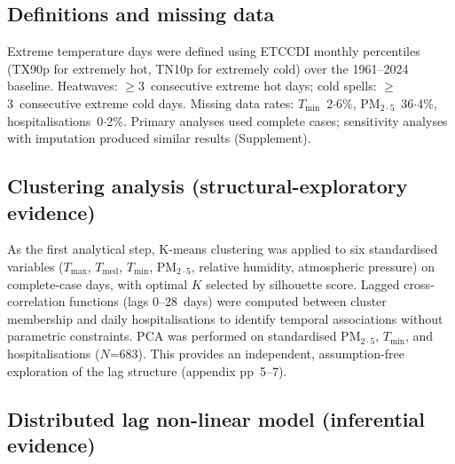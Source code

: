 \documentclass[review,number]{elsarticle}
\begin{document}
\subsection{Definitions and missing data}

Extreme temperature days were defined using ETCCDI monthly percentiles
(TX90p for extremely hot, TN10p for extremely cold) over the 1961--2024
baseline. Heatwaves: $\geq$3~consecutive extreme hot days; cold spells:
$\geq$3~consecutive extreme cold days. Missing data rates:
$T_\mathrm{min}$~2${\cdot}$6\%, $\text{PM}_{2{\cdot}5}$~36${\cdot}$4\%,
hospitalisations~0${\cdot}$2\%. Primary analyses used complete cases;
sensitivity analyses with imputation produced similar results
(Supplement).

\subsection{Clustering analysis (structural-exploratory evidence)}

As the first analytical step, K-means
clustering\cite{MacQueen1967} was applied to six standardised variables
($T_\mathrm{max}$, $T_\mathrm{med}$, $T_\mathrm{min}$,
$\text{PM}_{2{\cdot}5}$, relative humidity, atmospheric pressure) on
complete-case days, with optimal $K$ selected by silhouette
score.\cite{Rousseeuw1987} Lagged cross-correlation functions (lags
0--28~days) were computed between cluster membership and daily
hospitalisations to identify temporal associations without
parametric constraints. PCA was performed on standardised
$\text{PM}_{2{\cdot}5}$, $T_\mathrm{min}$, and hospitalisations ($N$=683).
This provides an independent, assumption-free exploration of the
lag structure (appendix pp~5--7).

\subsection{Distributed lag non-linear model (inferential evidence)}
\label{sec:dlnm}
\end{document}
